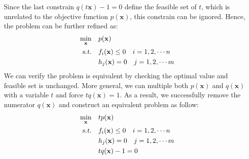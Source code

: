 \documentclass[10pt,a4paper]{article}
\begin{document}
Since the last constrain $q(t \mathbf{x}) - 1 = 0$ define the feasible set of $t$, which is unrelated to the objective function $p(\mathbf{x})$, this constrain can be ignored. Hence, the problem can be further refined as:
\begin{equation}
	\begin{aligned}
		\displaystyle\min_{\mathbf{x}} \quad & p(\mathbf{x}) \\
		\textsl{s.t.} \quad & f_{i}(\mathbf{x}) \leq 0 \quad i = 1, 2, \cdots n \\
		& h_{j}(\mathbf{x}) = 0 \quad j = 1, 2, \cdots m \\
	\end{aligned}
\end{equation}
We can verify the problem is equivalent by checking the optimal value and feasible set is unchanged. More general, we can multiple both $p(\mathbf{x})$ and $q(\mathbf{x})$ with a variable $t$ and force $t q(\mathbf{x}) = 1$. As a result, we successfully remove the numerator $q(\mathbf{x})$ and construct an equivalent problem as follow:
\begin{equation*}
	\begin{aligned}
		\displaystyle\min_{\mathbf{x}} \quad & t p(\mathbf{x}) \\
		\textsl{s.t.} \quad & f_{i}(\mathbf{x}) \leq 0 \quad i = 1, 2, \cdots n \\
		& h_{j}(\mathbf{x}) = 0 \quad j = 1, 2, \cdots m \\
		& t q(\mathbf{x}) - 1 = 0
	\end{aligned}
\end{equation*}
\end{document}
